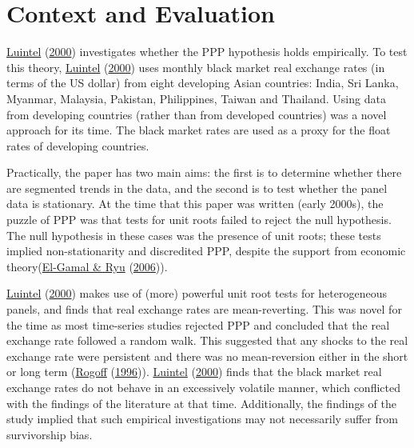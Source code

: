 \documentclass[11pt,preprint, authoryear]{elsarticle}
\numberwithin{equation}{section}
\numberwithin{figure}{section}
\numberwithin{table}{section}
\begin{document}
\hypertarget{context-and-evaluation}{%
\section{\texorpdfstring{Context and Evaluation
\label{Context}}{Context and Evaluation }}\label{context-and-evaluation}}

\protect\hyperlink{ref-Kul}{Luintel} (\protect\hyperlink{ref-Kul}{2000})
investigates whether the PPP hypothesis holds empirically. To test this
theory, \protect\hyperlink{ref-Kul}{Luintel}
(\protect\hyperlink{ref-Kul}{2000}) uses monthly black market real
exchange rates (in terms of the US dollar) from eight developing Asian
countries: India, Sri Lanka, Myanmar, Malaysia, Pakistan, Philippines,
Taiwan and Thailand. Using data from developing countries (rather than
from developed countries) was a novel approach for its time. The black
market rates are used as a proxy for the float rates of developing
countries.

Practically, the paper has two main aims: the first is to determine
whether there are segmented trends in the data, and the second is to
test whether the panel data is stationary. At the time that this paper
was written (early 2000s), the puzzle of PPP was that tests for unit
roots failed to reject the null hypothesis. The null hypothesis in these
cases was the presence of unit roots; these tests implied
non-stationarity and discredited PPP, despite the support from economic
theory(\protect\hyperlink{ref-puz}{El-Gamal \& Ryu}
(\protect\hyperlink{ref-puz}{2006})).

\protect\hyperlink{ref-Kul}{Luintel} (\protect\hyperlink{ref-Kul}{2000})
makes use of (more) powerful unit root tests for heterogeneous panels,
and finds that real exchange rates are mean-reverting. This was novel
for the time as most time-series studies rejected PPP and concluded that
the real exchange rate followed a random walk. This suggested that any
shocks to the real exchange rate were persistent and there was no
mean-reversion either in the short or long term
(\protect\hyperlink{ref-rog}{Rogoff}
(\protect\hyperlink{ref-rog}{1996})).
\protect\hyperlink{ref-Kul}{Luintel} (\protect\hyperlink{ref-Kul}{2000})
finds that the black market real exchange rates do not behave in an
excessively volatile manner, which conflicted with the findings of the
literature at that time. Additionally, the findings of the study implied
that such empirical investigations may not necessarily suffer from
survivorship bias.
\end{document}
